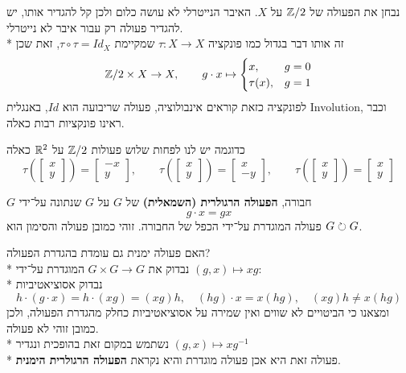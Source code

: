 \begin{definition}[אינבולוציה]
	נבחן את הפעולה של $\mathbb{Z}/2$ על $X$. האיבר הנייטרלי לא עושה כלום ולכן קל להגדיר אותו, יש להגדיר פעולה רק עבור איבר לא נייטרלי. \\*
	זה אותו דבר בגדול כמו פונקציה $\tau : X \to X$ שמקיימת $\tau \circ \tau = Id_X$, זאת שכן
	\[
		\mathbb{Z}/2 \times X \to X, \qquad g \cdot x \mapsto \begin{cases}
			x, & g = 0 \\
			\tau(x), & g = 1
		\end{cases}
	\]
	לפונקציה כזאת קוראים אינבולוציה, פעולה שריבועה הוא $Id$, באנגלית Involution, וכבר ראינו פונקציות רבות כאלה.
\end{definition}

כדוגמה יש לנו לפחות שלוש פעולות $\mathbb{Z}/2$ על $\mathbb{R}^2$ כאלה
\[
	\tau( \begin{bmatrix} x \\ y \end{bmatrix}) = \begin{bmatrix} -x \\ y \end{bmatrix}, \qquad
	\tau( \begin{bmatrix} x \\ y \end{bmatrix}) = \begin{bmatrix} x \\ -y \end{bmatrix}, \qquad
	\tau( \begin{bmatrix} x \\ y \end{bmatrix}) = \begin{bmatrix} x \\ y \end{bmatrix}
\]

\begin{definition}
$G$ חבורה, \textbf{הפעולה הרגולרית (השמאלית)} של $G$ על $G$ שנתונה על־ידי
\[
	g \cdot x = gx
\]
פעולה המוגדרת על־ידי הכפל של החבורה. זוהי כמובן פעולה והסימון הוא $G \circlearrowright G$.
\end{definition}
האם פעולה ימנית גם עומדת בהגדרת הפעולה? \\*
נבדוק את $G \times G \to G$ המוגדרת על־ידי $(g, x) \mapsto xg$: \\*
נבדוק אסוציאטיביות
\[
	h \cdot (g \cdot x) = h \cdot (xg) = (xg)h, \quad (hg) \cdot x = x (hg), \quad (xg) h \ne x (hg)
\]
ומצאנו כי הביטויים לא שווים ואין שמירה על אסוציאטיביות כחלק מהגדרת הפעולה, ולכן כמובן זוהי לא פעולה. \\*
נשתמש במקום זאת בהופכית ונגדיר $(g, x) \mapsto x g^{-1}$ \\*
פעולה זאת היא אכן פעולה מוגדרת והיא נקראת \textbf{הפעולה הרגולרית הימנית}.


